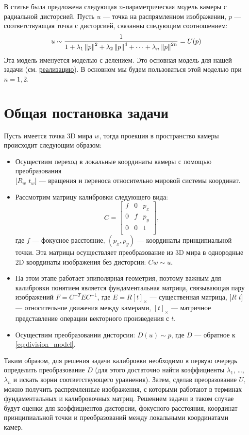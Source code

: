 \label{model}
В статье \cite{Fitzgibbon01b} была предложена следующая $n$-параметрическая модель камеры с радиальной дисторсией. Пусть $u$ --- точка на распрямленном изображении, $p$ --- соответствующая точка с дисторсией, связанны следующим соотношением:
\begin{equation}
	u \sim \frac{1}{1 + \lambda_1\left\lVert p\right\rVert^2 + \lambda_2\left\lVert p\right\rVert^4 + \cdots + \lambda_n\left\lVert p\right\rVert^{2n}} = U(p) \label{eq:division_model}
\end{equation} 
Эта модель именуется моделью с делением. Это основная модель для нашей задачи (см. \href{https://github.com/QuantumMechanicus/camera_calibration/blob/dev/core/scene/Intrinsics.h}{реализацию}). В основном мы будем пользоваться этой моделью при $n = 1, 2$.

\section{Общая постановка задачи}
Пусть имеется точка 3D мира $w$, тогда проекция в пространство камеры происходит следующим образом:
\begin{itemize}
	\item Осуществим переход в локальные координаты камеры с помощью преобразования \\$[R_w$ $t_w]$ --- вращения и переноса относительно мировой системы координат.
	\item Рассмотрим матрицу калибровки следующего вида: 
	\begin{equation}
		C = \begin{bmatrix}
		f & 0 & p_x \\
		0 & f & p_y \\
		0 & 0 & 1 \\
		\end{bmatrix}, 
	\end{equation}
	где $f$ --- фокусное расстояние,  $\left(p_x, p_y\right)$ --- координаты принципиальной точки. Эта матрицы осуществляет преобразование из 3D мира в однородные 2D координаты изображения без дисторсии: $Cw \sim u$. 
	\item На этом этапе работает эпиполярная геометрия, поэтому важным для калибровки понятием является фундаментальная матрица, связывающая пару изображений $F = C^{-T}EC^{-1}$, где $E = R [t]_{\times}$ --- существенная матрица, $[R$ $t]$ ---  относительное движения между камерами, $[t]_{\times}$ --- матричное представление операции векторного произведения с $t$.   
	\item Осуществим преобразовании дисторсии: $D(u) \sim p$, где $D$ --- обратное к \eqref{eq:division_model}.
\end{itemize} 
Таким образом, для решения задачи калибровки необходимо в первую очередь определить преобразование $D$ (для этого достаточно найти коэффициенты $\lambda_1$, \dots, $\lambda_n$ и искать корни соответствующего уравнения). Затем, сделав преоразование $U$, можно получить распрямленные изображения, с которыми работают в терминах фундаментальных и калибровочных матриц. Решением задачи в таком случае будут оценки для коэффициентов дисторсии, фокусного расстояния, координат принципиальной точки и преобразований между локальными координатами камер.
